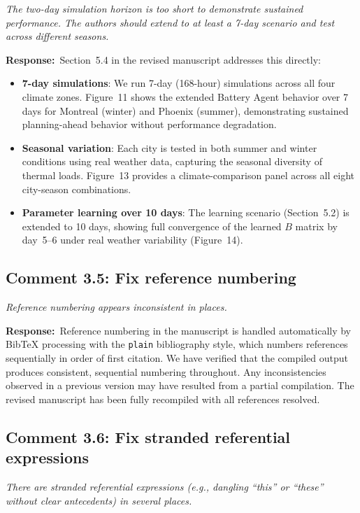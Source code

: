 \documentclass[11pt]{article}
\newcommand{\reviewercomment}[1]{\textit{#1}}
\newcommand{\response}{\textbf{Response:}\ }
\begin{document}
\reviewercomment{The two-day simulation horizon is too short to demonstrate sustained performance. The authors should extend to at least a 7-day scenario and test across different seasons.}

\response Section~5.4 in the revised manuscript addresses this directly:

\begin{itemize}
    \item \textbf{7-day simulations}: We run 7-day (168-hour) simulations across all four climate zones. Figure~11 shows the extended Battery Agent behavior over 7 days for Montreal (winter) and Phoenix (summer), demonstrating sustained planning-ahead behavior without performance degradation.
    \item \textbf{Seasonal variation}: Each city is tested in both summer and winter conditions using real weather data, capturing the seasonal diversity of thermal loads. Figure~13 provides a climate-comparison panel across all eight city-season combinations.
    \item \textbf{Parameter learning over 10 days}: The learning scenario (Section~5.2) is extended to 10 days, showing full convergence of the learned $B$ matrix by day~5--6 under real weather variability (Figure~14).
\end{itemize}

\subsection*{Comment 3.5: Fix reference numbering}

\reviewercomment{Reference numbering appears inconsistent in places.}

\response Reference numbering in the manuscript is handled automatically by BibTeX processing with the \texttt{plain} bibliography style, which numbers references sequentially in order of first citation. We have verified that the compiled output produces consistent, sequential numbering throughout. Any inconsistencies observed in a previous version may have resulted from a partial compilation. The revised manuscript has been fully recompiled with all references resolved.

\subsection*{Comment 3.6: Fix stranded referential expressions}

\reviewercomment{There are stranded referential expressions (e.g., dangling ``this'' or ``these'' without clear antecedents) in several places.}
\end{document}
